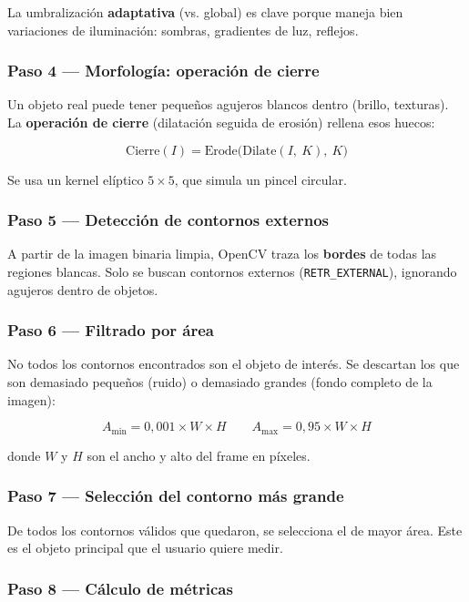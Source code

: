 \documentclass[12pt, a4paper]{article}
\begin{document}
La umbralización \textbf{adaptativa} (vs. global) es clave porque maneja
bien variaciones de iluminación: sombras, gradientes de luz, reflejos.

\subsubsection{Paso 4 — Morfología: operación de cierre}

Un objeto real puede tener pequeños agujeros blancos dentro (brillo, texturas).
La \textbf{operación de cierre} (dilatación seguida de erosión) rellena esos huecos:

$$\text{Cierre}(I) = \text{Erode}\big(\text{Dilate}(I,\ K),\ K\big)$$

Se usa un kernel elíptico $5 \times 5$, que simula un pincel circular.

\subsubsection{Paso 5 — Detección de contornos externos}

A partir de la imagen binaria limpia, OpenCV traza los \textbf{bordes}
de todas las regiones blancas. Solo se buscan contornos externos
(\texttt{RETR\_EXTERNAL}), ignorando agujeros dentro de objetos.

\subsubsection{Paso 6 — Filtrado por área}

No todos los contornos encontrados son el objeto de interés.
Se descartan los que son demasiado pequeños (ruido) o demasiado grandes
(fondo completo de la imagen):

$$A_{\min} = 0{,}001 \times W \times H \qquad A_{\max} = 0{,}95 \times W \times H$$

donde $W$ y $H$ son el ancho y alto del frame en píxeles.

\subsubsection{Paso 7 — Selección del contorno más grande}

De todos los contornos válidos que quedaron, se selecciona el de mayor área.
Este es el objeto principal que el usuario quiere medir.

\subsubsection{Paso 8 — Cálculo de métricas}
\end{document}
